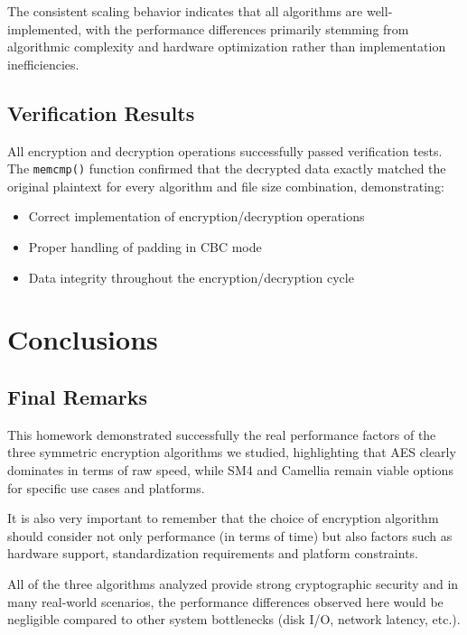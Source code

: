 \documentclass[12pt,a4paper]{article}
\begin{document}
The consistent scaling behavior indicates that all algorithms are well-implemented, with the performance differences primarily stemming from algorithmic complexity and hardware optimization rather than implementation inefficiencies.

\subsection{Verification Results}
All encryption and decryption operations successfully passed verification tests. The \texttt{memcmp()} function confirmed that the decrypted data exactly matched the original plaintext for every algorithm and file size combination, demonstrating:
\begin{itemize}
    \item Correct implementation of encryption/decryption operations
    \item Proper handling of padding in CBC mode
    \item Data integrity throughout the encryption/decryption cycle
\end{itemize}

\newpage

\section{Conclusions}

\subsection{Final Remarks}
This homework demonstrated successfully the real performance factors of the three symmetric encryption algorithms we studied, highlighting that AES clearly dominates in terms of raw speed, while SM4 and Camellia remain viable options for specific use cases and platforms.

It is also very important to remember that the choice of encryption algorithm should consider not only performance (in terms of time) but also factors such as hardware support, standardization requirements and platform constraints.

All of the three algorithms analyzed provide strong cryptographic security and in many real-world scenarios, the performance differences observed here would be negligible compared to other system bottlenecks (disk I/O, network latency, etc.).
\end{document}
